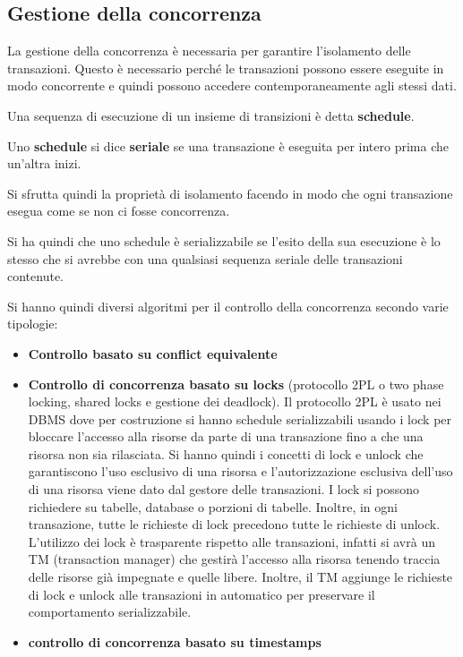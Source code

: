 \subsection{Gestione della concorrenza}
La gestione della concorrenza è necessaria per garantire l'isolamento delle
transazioni. Questo è necessario perché le transazioni possono essere eseguite
in modo concorrente e quindi possono accedere contemporaneamente agli stessi
dati.
\begin{definizione}
      Una sequenza di esecuzione di un insieme di transizioni è detta \textbf{schedule}.
\end{definizione}
\begin{definizione}
      Uno \textbf{schedule} si dice \textbf{seriale} se una transazione è eseguita
      per intero prima che un'altra inizi.
\end{definizione}
Si sfrutta quindi la proprietà di isolamento facendo in modo che ogni
transazione esegua come se non ci fosse concorrenza.

Si ha quindi che uno schedule è serializzabile se l'esito della sua esecuzione è
lo stesso che si avrebbe con una qualsiasi sequenza seriale delle transazioni
contenute.

Si hanno quindi diversi algoritmi per il controllo della concorrenza secondo
varie tipologie:
\begin{itemize}
      \item \textbf{Controllo basato su conflict equivalente}
      \item \textbf{Controllo di concorrenza basato su locks} (protocollo 2PL o two
            phase locking, shared locks e gestione dei deadlock). Il protocollo
            2PL è usato nei DBMS dove per costruzione si hanno schedule
            serializzabili usando i lock per bloccare l'accesso alla risorse da
            parte di una transazione fino a che una risorsa non sia rilasciata.
            Si hanno quindi i concetti di lock e unlock che garantiscono l'uso
            esclusivo di una risorsa e l'autorizzazione esclusiva dell'uso di una
            risorsa viene dato dal gestore delle transazioni. I lock si possono
            richiedere su tabelle, database o porzioni di tabelle.
            Inoltre, in ogni transazione, tutte le richieste di lock precedono tutte
            le richieste di unlock. L'utilizzo dei lock è trasparente rispetto alle
            transazioni, infatti si avrà un TM (transaction manager) che gestirà
            l'accesso alla risorsa tenendo traccia delle risorse già impegnate e quelle
            libere. Inoltre, il TM aggiunge le richieste di lock e unlock alle
            transazioni in automatico per preservare il comportamento serializzabile.
      \item \textbf{controllo di concorrenza basato su timestamps}
\end{itemize}